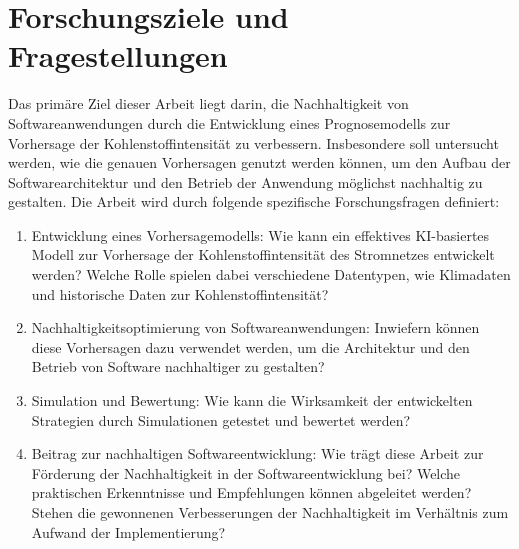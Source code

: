 
\section{Forschungsziele und Fragestellungen}
Das primäre Ziel dieser Arbeit liegt darin, die Nachhaltigkeit von Softwareanwendungen durch die Entwicklung eines Prognosemodells zur Vorhersage der Kohlenstoffintensität zu verbessern.
Insbesondere soll untersucht werden, wie die genauen Vorhersagen genutzt werden können, um den Aufbau der Softwarearchitektur und den Betrieb der Anwendung möglichst nachhaltig zu gestalten.
Die Arbeit wird durch folgende spezifische Forschungsfragen definiert:

\begin{enumerate}
 \item Entwicklung eines Vorhersagemodells: Wie kann ein effektives KI-basiertes Modell zur Vorhersage der Kohlenstoffintensität des Stromnetzes entwickelt werden? Welche Rolle spielen dabei verschiedene Datentypen, wie Klimadaten und historische Daten zur Kohlenstoffintensität?
 \item Nachhaltigkeitsoptimierung von Softwareanwendungen: Inwiefern können diese Vorhersagen dazu verwendet werden, um die Architektur und den Betrieb von Software nachhaltiger zu gestalten?
 \item Simulation und Bewertung: Wie kann die Wirksamkeit der entwickelten Strategien durch Simulationen getestet und bewertet werden?
 \item Beitrag zur nachhaltigen Softwareentwicklung: Wie trägt diese Arbeit zur Förderung der Nachhaltigkeit in der Softwareentwicklung bei? Welche praktischen Erkenntnisse und Empfehlungen können abgeleitet werden? Stehen die gewonnenen Verbesserungen der Nachhaltigkeit im Verhältnis zum Aufwand der Implementierung?
\end{enumerate}
%

